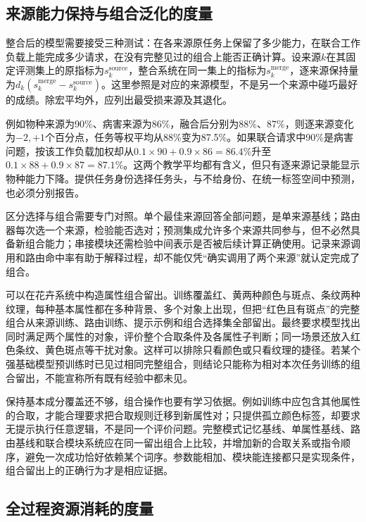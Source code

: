 \subsection{来源能力保持与组合泛化的度量}
\label{sec:ket-evaluation-composition}

整合后的模型需要接受三种测试：在各来源原任务上保留了多少能力，在联合工作负载上能完成多少请求，在没有完整见过的组合上能否正确计算。设来源$k$在其固定评测集上的原指标为$s_k^{\mathrm{source}}$，整合系统在同一集上的指标为$s_k^{\mathrm{merge}}$，逐来源保持量为$d_k(s_k^{\mathrm{merge}}-s_k^{\mathrm{source}})$。这里参照是对应的来源模型，不是另一个来源中碰巧最好的成绩。除宏平均外，应列出最受损来源及其退化。

例如物种来源为90\%、病害来源为86\%，融合后分别为88\%、87\%，则逐来源变化为$-2,+1$个百分点，任务等权平均从88\%变为87.5\%。如果联合请求中90\%是病害问题，按该工作负载加权却从$0.1\times90+0.9\times86=86.4\%$升至$0.1\times88+0.9\times87=87.1\%$。这两个教学平均都有含义，但只有逐来源记录能显示物种能力下降。提供任务身份选择任务头，与不给身份、在统一标签空间中预测，也必须分别报告。

区分选择与组合需要专门对照。单个最佳来源回答全部问题，是单来源基线；路由器每次选一个来源，检验能否选对；预测集成允许多个来源共同参与，但不必然具备新组合能力；串接模块还需检验中间表示是否被后续计算正确使用。记录来源调用和路由命中率有助于解释过程，却不能仅凭“确实调用了两个来源”就认定完成了组合。

可以在花卉系统中构造属性组合留出。训练覆盖红、黄两种颜色与斑点、条纹两种纹理，每种基本属性都在多种背景、多个对象上出现，但把“红色且有斑点”的完整组合从来源训练、路由训练、提示示例和组合选择集全部留出。最终要求模型找出同时满足两个属性的对象，评价整个合取条件及各属性子判断；同一场景还放入红色条纹、黄色斑点等干扰对象。这样可以排除只看颜色或只看纹理的捷径。若某个强基础模型预训练时已见过相同完整组合，则结论只能称为相对本次任务训练的组合留出，不能宣称所有既有经验中都未见。

保持基本成分覆盖还不够，组合操作也要有学习依据。例如训练中应包含其他属性的合取，才能合理要求把合取规则迁移到新属性对；只提供孤立颜色标签，却要求无提示执行任意逻辑，不是同一个评价问题。完整模式记忆基线、单属性基线、路由基线和联合模块系统应在同一留出组合上比较，并增加新的合取关系或指令顺序，避免一次成功恰好依赖某个词序。参数能相加、模块能连接都只是实现条件，组合留出上的正确行为才是相应证据。

\subsection{全过程资源消耗的度量}
\label{sec:ket-evaluation-resources}

